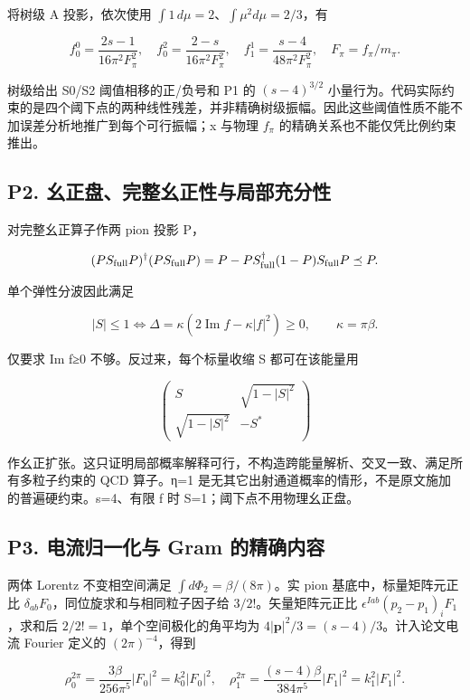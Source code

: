 \documentclass[
  11pt,
  a4paper,
]{article}
\begin{document}
将树级 A 投影，依次使用 \(\int1\,d\mu=2\)、\(\int\mu^2d\mu=2/3\)，有

\[
f^0_0=\frac{2s-1}{16\pi^2F_\pi^2},\quad
f^2_0=\frac{2-s}{16\pi^2F_\pi^2},\quad
f^1_1=\frac{s-4}{48\pi^2F_\pi^2},\quad F_\pi=f_\pi/m_\pi.
\]

树级给出 S0/S2 阈值相移的正/负号和 P1 的 \((s-4)^{3/2}\)
小量行为。代码实际约束的是四个阈下点的两种线性残差，并非精确树级振幅。因此这些阈值性质不能不加误差分析地推广到每个可行振幅；x
与物理 \(f_\pi\) 的精确关系也不能仅凭比例约束推出。

\subsection{P2.
幺正盘、完整幺正性与局部充分性}\label{p2.-ux5e7aux6b63ux76d8ux5b8cux6574ux5e7aux6b63ux6027ux4e0eux5c40ux90e8ux5145ux5206ux6027}

对完整幺正算子作两 pion 投影 P，

\[
(PS_{\rm full}P)^\dagger(PS_{\rm full}P)
=P-PS_{\rm full}^\dagger(1-P)S_{\rm full}P\preceq P.
\]

单个弹性分波因此满足

\[
|S|\le1\iff\Delta=\kappa(2\operatorname{Im}f-\kappa|f|^2)\ge0,
\qquad\kappa=\pi\beta.
\]

仅要求 Im f≥0 不够。反过来，每个标量收缩 S 都可在该能量用

\[
\begin{pmatrix}S&\sqrt{1-|S|^2}\\\sqrt{1-|S|^2}&-S^*\end{pmatrix}
\]

作幺正扩张。这只证明局部概率解释可行，不构造跨能量解析、交叉一致、满足所有多粒子约束的
QCD 算子。η=1
是无其它出射通道概率的情形，不是原文施加的普遍硬约束。s=4、有限 f 时
S=1；阈下点不用物理幺正盘。

\subsection{P3. 电流归一化与 Gram
的精确内容}\label{p3.-ux7535ux6d41ux5f52ux4e00ux5316ux4e0e-gram-ux7684ux7cbeux786eux5185ux5bb9}

两体 Lorentz 不变相空间满足 \(\int d\Phi_2=\beta/(8\pi)\)。实 pion
基底中，标量矩阵元正比 \(\delta_{ab}F_0\)，同位旋求和与相同粒子因子给
\(3/2!\)。矢量矩阵元正比 \(\epsilon^{Iab}(p_2-p_1)_iF_1\)，求和后
\(2/2!=1\)，单个空间极化的角平均为
\(4|\mathbf p|^2/3=(s-4)/3\)。计入论文电流 Fourier 定义的
\((2\pi)^{-4}\)，得到

\[
\rho^{2\pi}_0=\frac{3\beta}{256\pi^5}|F_0|^2=k_0^2|F_0|^2,
\quad\rho^{2\pi}_1=\frac{(s-4)\beta}{384\pi^5}|F_1|^2=k_1^2|F_1|^2.
\]
\end{document}
